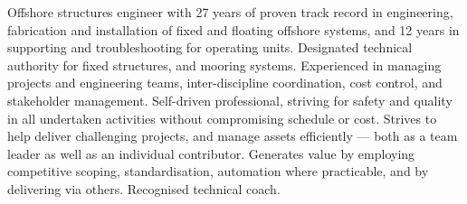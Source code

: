 \noindent Offshore structures engineer with 27 years of proven track record in engineering, fabrication and installation of fixed and floating offshore systems, and 12 years in supporting and troubleshooting for operating units. Designated technical authority for fixed structures, and mooring systems. Experienced in managing projects and engineering teams, inter-discipline coordination, cost control, and stakeholder management. Self-driven professional, striving for safety and quality in all undertaken activities without compromising schedule or cost. Strives to help deliver challenging projects, and manage assets efficiently --- both as a team leader as well as an individual contributor. Generates value by employing competitive scoping, standardisation, automation where practicable, and by delivering via others. Recognised technical coach.